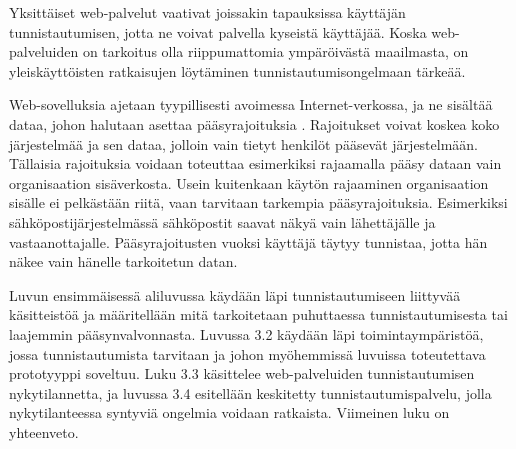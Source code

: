 Yksittäiset web-palvelut vaativat joissakin tapauksissa käyttäjän tunnistautumisen, jotta ne voivat palvella kyseistä käyttäjää. Koska web-palveluiden on tarkoitus olla riippumattomia ympäröivästä maailmasta, on yleiskäyttöisten ratkaisujen löytäminen tunnistautumisongelmaan tärkeää.

Web-sovelluksia ajetaan tyypillisesti avoimessa Internet-verkossa, ja ne sisältää dataa, johon halutaan asettaa pääsyrajoituksia \cite{inside_the_identity_management_game}. Rajoitukset voivat koskea koko järjestelmää ja sen dataa, jolloin vain tietyt henkilöt pääsevät järjestelmään. Tällaisia rajoituksia voidaan toteuttaa esimerkiksi rajaamalla pääsy dataan vain organisaation sisäverkosta. Usein kuitenkaan käytön rajaaminen organisaation sisälle ei pelkästään riitä, vaan tarvitaan tarkempia pääsyrajoituksia. Esimerkiksi sähköpostijärjestelmässä sähköpostit saavat näkyä vain lähettäjälle ja vastaanottajalle. Pääsyrajoitusten vuoksi käyttäjä täytyy tunnistaa, jotta hän näkee vain hänelle tarkoitetun datan.

Luvun ensimmäisessä aliluvussa käydään läpi tunnistautumiseen liittyvää käsitteistöä ja määritellään mitä tarkoitetaan puhuttaessa tunnistautumisesta tai laajemmin pääsynvalvonnasta. Luvussa 3.2 käydään läpi toimintaympäristöä, jossa tunnistautumista tarvitaan ja johon myöhemmissä luvuissa toteutettava prototyyppi soveltuu. Luku 3.3 käsittelee web-palveluiden tunnistautumisen nykytilannetta, ja luvussa 3.4 esitellään keskitetty tunnistautumispalvelu, jolla nykytilanteessa syntyviä ongelmia voidaan ratkaista. Viimeinen luku on yhteenveto.